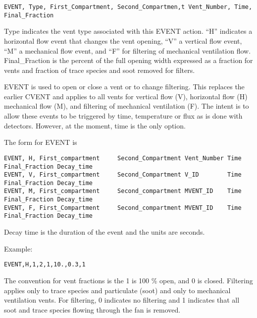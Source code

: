 \begin{lstlisting}
EVENT, Type, First_Compartment, Second_Compartmen,t Vent_Number, Time, Final_Fraction
\end{lstlisting}

Type indicates the vent type associated with this EVENT action. ``H'' indicates a horizontal flow event that changes the vent opening, ``V'' a vertical flow event, ``M'' a mechanical flow event, and ``F'' for filtering of mechanical ventilation flow.  Final\_Fraction is the percent of the full opening width expressed as a fraction for vents and fraction of trace species and soot removed for filters.

EVENT is used to open or close a vent or to change filtering. This replaces the earlier CVENT and applies to all vents for vertical flow (V), horizontal flow (H) mechanical flow (M), and filtering of mechanical ventilation (F). The intent is to allow these events to be triggered by time, temperature or flux as is done with detectors. However, at the moment, time is the only option.

The form for EVENT is

\begin{lstlisting}
EVENT, H, First_compartment     Second_Compartment Vent_Number Time Final_Fraction Decay_time
EVENT, V, First_compartment     Second_Compartment V_ID        Time Final_Fraction Decay_time
EVENT, M, First_compartment     Second_compartment MVENT_ID    Time Final_Fraction Decay_time
EVENT, F, First_Compartment     Second_compartment MVENT_ID    Time Final_Fraction Decay_time   
\end{lstlisting}

Decay time is the duration of the event and the units are seconds.

Example:

\begin{lstlisting}
EVENT,H,1,2,1,10.,0.3,1
\end{lstlisting}

The convention for vent fractions is the 1 is 100 \% open, and 0 is closed. Filtering applies only to trace species and particulate (soot) and only to mechanical ventilation vents. For filtering, 0 indicates no filtering and 1 indicates that all soot and trace species flowing through the fan is removed. 


